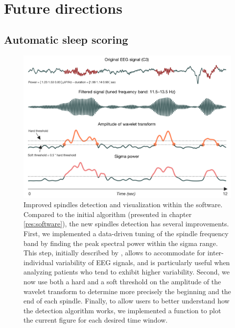 \section{Future directions}
\label{disc:methods:future}

\subsection{Automatic sleep scoring}
\label{disc:methods:future:auto}

\begin{figure}[htb]
	\includegraphics[width=\textwidth]{Fig/Discussion/spindles.png}
	\caption[Improved spindles detection and visualization]{Improved spindles detection and visualization within the software. Compared to the initial algorithm (presented in chapter \ref{res:software}), the new spindles detection has several improvements. First, we implemented a data-driven tuning of the spindle frequency band by finding the peak spectral power within the sigma range. This step, initially described by \citet{berthomier_automatic_2007}, allows to accommodate for inter-individual variability of EEG signals, and is particularly useful when analyzing patients who tend to exhibit higher variability. Second, we now use both a hard and a soft threshold on the amplitude of the wavelet transform to determine more precisely the beginning and the end of each spindle. Finally, to allow users to better understand how the detection algorithm works, we implemented a function to plot the current figure for each desired time window.}
	\label{fig:disc:methods:future:auto:spindles}
\end{figure}

